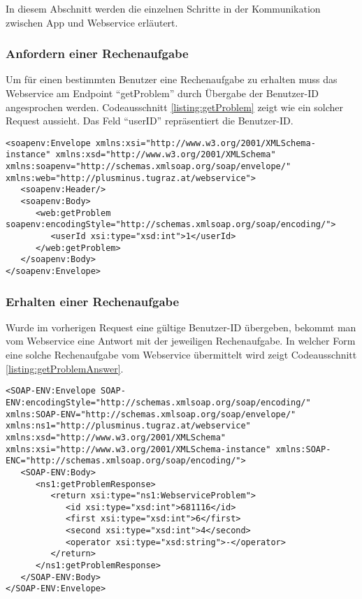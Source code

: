 In diesem Abschnitt werden die einzelnen Schritte in der Kommunikation zwischen App und Webservice erläutert.

\subsubsection{Anfordern einer Rechenaufgabe}
Um für einen bestimmten Benutzer eine Rechenaufgabe zu erhalten muss das Webservice am Endpoint \enquote{getProblem}
durch Übergabe der Benutzer-ID angesprochen werden. Codeausschnitt \ref{listing:getProblem} zeigt wie 
ein solcher Request aussieht. Das Feld \enquote{userID} repräsentiert die Benutzer-ID.

\begin{lstlisting}[caption=Anfordern einer Rechenaufgabe, label=listing:getProblem]
<soapenv:Envelope xmlns:xsi="http://www.w3.org/2001/XMLSchema-instance" xmlns:xsd="http://www.w3.org/2001/XMLSchema" xmlns:soapenv="http://schemas.xmlsoap.org/soap/envelope/" xmlns:web="http://plusminus.tugraz.at/webservice">
   <soapenv:Header/>
   <soapenv:Body>
      <web:getProblem soapenv:encodingStyle="http://schemas.xmlsoap.org/soap/encoding/">
         <userId xsi:type="xsd:int">1</userId>
      </web:getProblem>
   </soapenv:Body>
</soapenv:Envelope>
\end{lstlisting}

\subsubsection{Erhalten einer Rechenaufgabe}
Wurde im vorherigen Request eine gültige Benutzer-ID übergeben, bekommt man vom Webservice eine 
Antwort mit der jeweiligen Rechenaufgabe. In welcher Form eine solche Rechenaufgabe vom Webservice übermittelt
wird zeigt Codeausschnitt \ref{listing:getProblemAnswer}.

\begin{lstlisting}[caption=Erhalten einer Rechenaufgabe, label=listing:getProblemAnswer]
<SOAP-ENV:Envelope SOAP-ENV:encodingStyle="http://schemas.xmlsoap.org/soap/encoding/" xmlns:SOAP-ENV="http://schemas.xmlsoap.org/soap/envelope/" xmlns:ns1="http://plusminus.tugraz.at/webservice" xmlns:xsd="http://www.w3.org/2001/XMLSchema" xmlns:xsi="http://www.w3.org/2001/XMLSchema-instance" xmlns:SOAP-ENC="http://schemas.xmlsoap.org/soap/encoding/">
   <SOAP-ENV:Body>
      <ns1:getProblemResponse>
         <return xsi:type="ns1:WebserviceProblem">
            <id xsi:type="xsd:int">681116</id>
            <first xsi:type="xsd:int">6</first>
            <second xsi:type="xsd:int">4</second>
            <operator xsi:type="xsd:string">-</operator>
         </return>
      </ns1:getProblemResponse>
   </SOAP-ENV:Body>
</SOAP-ENV:Envelope>
\end{lstlisting}


